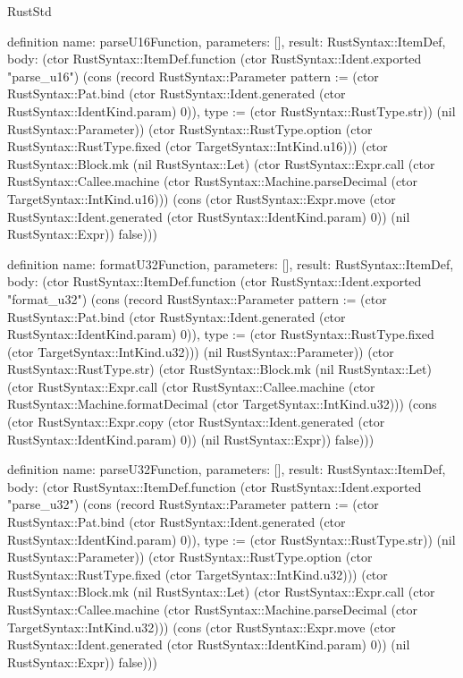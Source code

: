\begin{lexlean}{RustStd}
\begin{semanticmodule}
definition{
  name: parseU16Function,
  parameters: [],
  result: RustSyntax::ItemDef,
  body: (ctor RustSyntax::ItemDef.function (ctor RustSyntax::Ident.exported "parse_u16") (cons (record RustSyntax::Parameter {pattern := (ctor RustSyntax::Pat.bind (ctor RustSyntax::Ident.generated (ctor RustSyntax::IdentKind.param) 0)), type := (ctor RustSyntax::RustType.str)}) (nil RustSyntax::Parameter)) (ctor RustSyntax::RustType.option (ctor RustSyntax::RustType.fixed (ctor TargetSyntax::IntKind.u16))) (ctor RustSyntax::Block.mk (nil RustSyntax::Let) (ctor RustSyntax::Expr.call (ctor RustSyntax::Callee.machine (ctor RustSyntax::Machine.parseDecimal (ctor TargetSyntax::IntKind.u16))) (cons (ctor RustSyntax::Expr.move (ctor RustSyntax::Ident.generated (ctor RustSyntax::IdentKind.param) 0)) (nil RustSyntax::Expr)) false)))
}

definition{
  name: formatU32Function,
  parameters: [],
  result: RustSyntax::ItemDef,
  body: (ctor RustSyntax::ItemDef.function (ctor RustSyntax::Ident.exported "format_u32") (cons (record RustSyntax::Parameter {pattern := (ctor RustSyntax::Pat.bind (ctor RustSyntax::Ident.generated (ctor RustSyntax::IdentKind.param) 0)), type := (ctor RustSyntax::RustType.fixed (ctor TargetSyntax::IntKind.u32))}) (nil RustSyntax::Parameter)) (ctor RustSyntax::RustType.str) (ctor RustSyntax::Block.mk (nil RustSyntax::Let) (ctor RustSyntax::Expr.call (ctor RustSyntax::Callee.machine (ctor RustSyntax::Machine.formatDecimal (ctor TargetSyntax::IntKind.u32))) (cons (ctor RustSyntax::Expr.copy (ctor RustSyntax::Ident.generated (ctor RustSyntax::IdentKind.param) 0)) (nil RustSyntax::Expr)) false)))
}

definition{
  name: parseU32Function,
  parameters: [],
  result: RustSyntax::ItemDef,
  body: (ctor RustSyntax::ItemDef.function (ctor RustSyntax::Ident.exported "parse_u32") (cons (record RustSyntax::Parameter {pattern := (ctor RustSyntax::Pat.bind (ctor RustSyntax::Ident.generated (ctor RustSyntax::IdentKind.param) 0)), type := (ctor RustSyntax::RustType.str)}) (nil RustSyntax::Parameter)) (ctor RustSyntax::RustType.option (ctor RustSyntax::RustType.fixed (ctor TargetSyntax::IntKind.u32))) (ctor RustSyntax::Block.mk (nil RustSyntax::Let) (ctor RustSyntax::Expr.call (ctor RustSyntax::Callee.machine (ctor RustSyntax::Machine.parseDecimal (ctor TargetSyntax::IntKind.u32))) (cons (ctor RustSyntax::Expr.move (ctor RustSyntax::Ident.generated (ctor RustSyntax::IdentKind.param) 0)) (nil RustSyntax::Expr)) false)))
}


\end{semanticmodule}
\end{lexlean}
